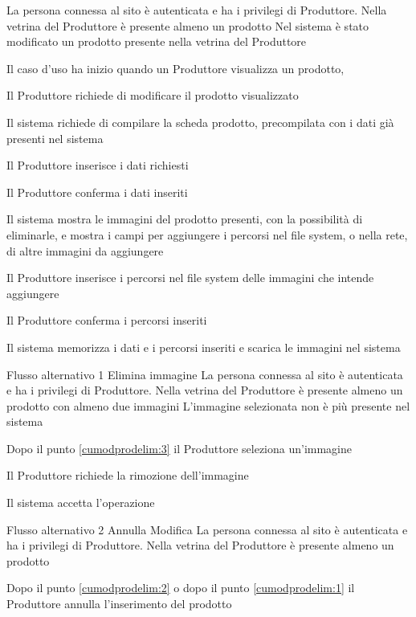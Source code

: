 {}
{La persona connessa al sito è autenticata e ha i privilegi di Produttore. Nella vetrina del Produttore è presente almeno un prodotto}%
{Nel sistema è stato modificato un prodotto presente nella vetrina del Produttore}
{\begin{enumCU}
		\item Il caso d'uso ha inizio quando un Produttore visualizza un prodotto, 
		\item Il Produttore richiede di modificare il prodotto visualizzato
		\item Il sistema richiede di compilare la scheda prodotto, precompilata con i dati già presenti nel sistema
		\item Il Produttore inserisce i dati richiesti \label{cumodprodelim:1}
		\item Il Produttore conferma i dati inseriti
		\item Il sistema mostra le immagini del prodotto presenti, con la possibilità di eliminarle, e mostra i campi per aggiungere i percorsi nel file system, o nella rete, di altre immagini da aggiungere \label{cumodprodelim:3}
		\item Il Produttore inserisce i percorsi nel file system delle immagini che intende aggiungere
		\item Il Produttore conferma i percorsi inseriti \label{cumodprodelim:2}
		\item Il sistema memorizza i dati e i percorsi inseriti e scarica le immagini nel sistema
	\end{enumCU}} %
%
{Flusso alternativo 1}%
{Elimina immagine}%
{La persona connessa al sito è autenticata e ha i privilegi di Produttore. Nella vetrina del Produttore è presente almeno un prodotto con almeno due immagini}
{L'immagine selezionata non è più presente nel sistema}%
{\begin{enumCU}
		\item Dopo il punto \ref{cumodprodelim:3} il Produttore seleziona un'immagine
		\item Il Produttore richiede la rimozione dell'immagine
		\item Il sistema accetta l'operazione
	\end{enumCU}}%
%
{Flusso alternativo 2}%
{Annulla Modifica}%
{La persona connessa al sito è autenticata e ha i privilegi di Produttore. Nella vetrina del Produttore è presente almeno un prodotto}%
{\postNulle}%
{\begin{enumCU}
		\item Dopo il punto \ref{cumodprodelim:2} o dopo il punto \ref{cumodprodelim:1} il Produttore annulla l'inserimento del prodotto
	\end{enumCU}}%

